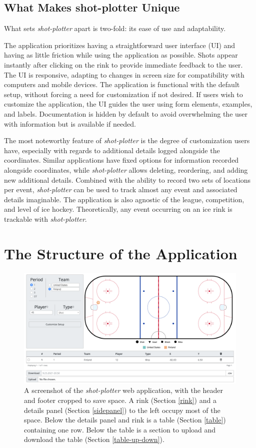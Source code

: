 \documentclass[letterpaper]{article}
\begin{document}
\subsection{What Makes shot-plotter Unique}
What sets \textit{shot-plotter} apart is two-fold: its ease of use and adaptability. 

The application prioritizes having a straightforward user interface (UI) and having as little friction while using the application as possible. Shots appear instantly after clicking on the rink to provide immediate feedback to the user. The UI is responsive, adapting to changes in screen size for compatibility with computers and mobile devices. The application is functional with the default setup, without forcing a need for customization if not desired. If users wish to customize the application, the UI guides the user using form elements, examples, and labels. Documentation is hidden by default to avoid overwhelming the user with information but is available if needed.

The most noteworthy feature of \textit{shot-plotter} is the degree of customization users have, especially with regards to additional details logged alongside the coordinates. Similar applications have fixed options for information recorded alongside coordinates, while \textit{shot-plotter} allows deleting, reordering, and adding new additional details. Combined with the ability to record two sets of locations per event, \textit{shot-plotter} can be used to track almost any event and associated details imaginable. The application is also agnostic of the league, competition, and level of ice hockey. Theoretically, any event occurring on an ice rink is trackable with \textit{shot-plotter}.


\section{The Structure of the Application}

\begin{figure}[h!]
	\centering
	\includegraphics[width=1\linewidth]{images/full-screenshot}
	\caption{A screenshot of the \textit{shot-plotter} web application, with the header and footer cropped to save space. A rink (Section \ref{rink}) and a details panel (Section \ref{sidepanel}) to the left occupy most of the space. Below the details panel and rink is a table (Section \ref{table}) containing one row. Below the table is a section to upload and download the table (Section \ref{table-up-down}).}
	\label{fig:full-screenshot}
\end{figure}
\end{document}
